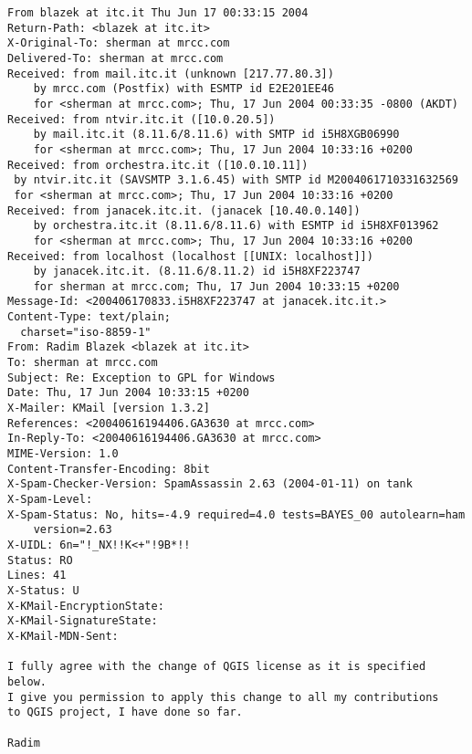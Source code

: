 \begin{small}
\begin{verbatim}
From blazek at itc.it Thu Jun 17 00:33:15 2004
Return-Path: <blazek at itc.it>
X-Original-To: sherman at mrcc.com
Delivered-To: sherman at mrcc.com
Received: from mail.itc.it (unknown [217.77.80.3])
	by mrcc.com (Postfix) with ESMTP id E2E201EE46
	for <sherman at mrcc.com>; Thu, 17 Jun 2004 00:33:35 -0800 (AKDT)
Received: from ntvir.itc.it ([10.0.20.5])
	by mail.itc.it (8.11.6/8.11.6) with SMTP id i5H8XGB06990
	for <sherman at mrcc.com>; Thu, 17 Jun 2004 10:33:16 +0200
Received: from orchestra.itc.it ([10.0.10.11])
 by ntvir.itc.it (SAVSMTP 3.1.6.45) with SMTP id M2004061710331632569
 for <sherman at mrcc.com>; Thu, 17 Jun 2004 10:33:16 +0200
Received: from janacek.itc.it. (janacek [10.40.0.140])
	by orchestra.itc.it (8.11.6/8.11.6) with ESMTP id i5H8XF013962
	for <sherman at mrcc.com>; Thu, 17 Jun 2004 10:33:16 +0200
Received: from localhost (localhost [[UNIX: localhost]])
	by janacek.itc.it. (8.11.6/8.11.2) id i5H8XF223747
	for sherman at mrcc.com; Thu, 17 Jun 2004 10:33:15 +0200
Message-Id: <200406170833.i5H8XF223747 at janacek.itc.it.>
Content-Type: text/plain;
  charset="iso-8859-1"
From: Radim Blazek <blazek at itc.it>
To: sherman at mrcc.com
Subject: Re: Exception to GPL for Windows
Date: Thu, 17 Jun 2004 10:33:15 +0200
X-Mailer: KMail [version 1.3.2]
References: <20040616194406.GA3630 at mrcc.com>
In-Reply-To: <20040616194406.GA3630 at mrcc.com>
MIME-Version: 1.0
Content-Transfer-Encoding: 8bit
X-Spam-Checker-Version: SpamAssassin 2.63 (2004-01-11) on tank
X-Spam-Level: 
X-Spam-Status: No, hits=-4.9 required=4.0 tests=BAYES_00 autolearn=ham 
	version=2.63
X-UIDL: 6n="!_NX!!K<+"!9B*!!
Status: RO
Lines: 41
X-Status: U
X-KMail-EncryptionState:  
X-KMail-SignatureState:  
X-KMail-MDN-Sent:  

I fully agree with the change of QGIS license as it is specified below.
I give you permission to apply this change to all my contributions 
to QGIS project, I have done so far.

Radim


\end{verbatim}
\end{small}

